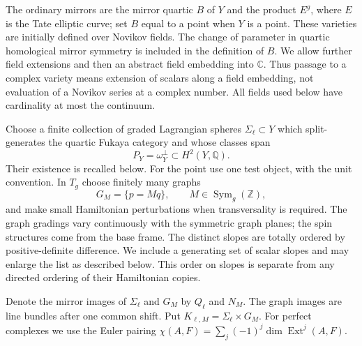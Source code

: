 \documentclass[11pt]{article}
\numberwithin{equation}{section}
\theoremstyle{definition}
\theoremstyle{remark}
\begin{document}
The ordinary mirrors are the mirror quartic $B$ of $Y$ and the product
$E^g$, where $E$ is the Tate elliptic curve; set $B$ equal to a point
when $Y$ is a point.  These varieties are initially
defined over Novikov fields.  The change of parameter in quartic
homological mirror symmetry is included in the definition of $B$.
We allow further field extensions and then an abstract field embedding
into $\mathbb C$.  Thus passage to a complex variety means extension of scalars
along a field embedding, not evaluation of a Novikov series at a complex
number.  All fields used below have cardinality at most the continuum.

Choose a finite collection of graded Lagrangian spheres $\Sigma_\ell\subset Y$
which split-generates the quartic Fukaya category and whose classes span
\begin{equation}
 P_Y=\omega_Y^\perp\subset H^2(Y,\mathbb Q).
 \label{setup:primitive-space}
\end{equation}
Their existence is recalled below.  For the point use one test object,
with the unit convention.  In $T_g$ choose finitely many graphs
\begin{equation}
 G_M=\{p=Mq\},\qquad M\in\operatorname{Sym}_g(\mathbb Z),
 \label{setup:graphs}
\end{equation}
and make small Hamiltonian perturbations when transversality is required.
The graph gradings vary continuously with the symmetric graph planes;
the spin structures come from the base frame.  The distinct slopes are
totally ordered by positive-definite difference.  We include a generating
set of scalar slopes and may enlarge the list as described below.
This order on slopes is separate from any directed ordering of their
Hamiltonian copies.

Denote the mirror images of $\Sigma_\ell$ and $G_M$ by $Q_\ell$ and $N_M$.
The graph images are line bundles after one common shift.  Put
$K_{\ell,M}=\Sigma_\ell\times G_M$.  For perfect complexes we use the Euler
pairing
$\chi(A,F)=\sum_j(-1)^j\dim\operatorname{Ext}^j(A,F)$.
\end{document}
